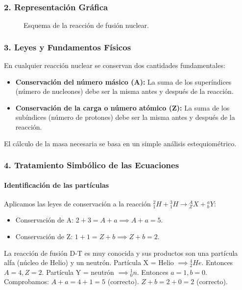 \subsubsection*{2. Representación Gráfica}
\begin{figure}[H]
    \centering
    \caption{Esquema de la reacción de fusión nuclear.}
\end{figure}

\subsubsection*{3. Leyes y Fundamentos Físicos}
En cualquier reacción nuclear se conservan dos cantidades fundamentales:
\begin{itemize}
    \item \textbf{Conservación del número másico (A):} La suma de los superíndices (número de nucleones) debe ser la misma antes y después de la reacción.
    \item \textbf{Conservación de la carga o número atómico (Z):} La suma de los subíndices (número de protones) debe ser la misma antes y después de la reacción.
\end{itemize}
El cálculo de la masa necesaria se basa en un simple análisis estequiométrico.

\subsubsection*{4. Tratamiento Simbólico de las Ecuaciones}
\paragraph*{Identificación de las partículas}
Aplicamos las leyes de conservación a la reacción ${}_{1}^{2}H + {}_{1}^{3}H \rightarrow {}_{Z}^{A}X + {}_{b}^{a}Y$:
\begin{itemize}
    \item Conservación de A: $2 + 3 = A + a \implies A+a=5$.
    \item Conservación de Z: $1 + 1 = Z + b \implies Z+b=2$.
\end{itemize}
La reacción de fusión D-T es muy conocida y sus productos son una partícula alfa (núcleo de Helio) y un neutrón.
Partícula X = Helio $\implies {}_{2}^{4}He$. Entonces $A=4, Z=2$.
Partícula Y = neutrón $\implies {}_{0}^{1}n$. Entonces $a=1, b=0$.
Comprobamos: $A+a=4+1=5$ (correcto). $Z+b=2+0=2$ (correcto).

